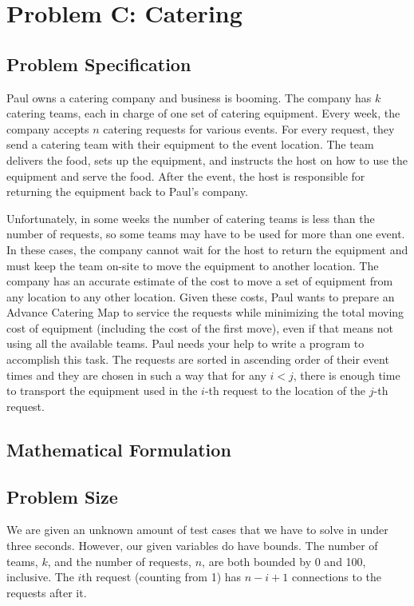 \documentclass[12pt]{article}
\begin{document}
\newpage

\section{Problem C: Catering}

\subsection{Problem Specification}

Paul owns a catering company and business is booming. The company has $k$
catering teams, each in charge of one set of catering equipment. Every
week, the company accepts $n$ catering requests for various events.
For every request, they send a catering team with their equipment to the
event location. The team delivers the food, sets up the equipment, and instructs
the host on how to use the equipment and serve the food. After the event, the
host is responsible for returning the equipment back to Paul’s company.

Unfortunately, in some weeks the number of catering teams is less than the number
of requests, so some teams may have to be used for more than one event. In these
cases, the company cannot wait for the host to return the equipment and must keep
the team on-site to move the equipment to another location. The company has an
accurate estimate of the cost to move a set of equipment from any location to any
other location. Given these costs, Paul wants to prepare an Advance Catering Map
to service the requests while minimizing the total moving cost of equipment
(including the cost of the first move), even if that means not using all the
available teams. Paul needs your help to write a program to accomplish this task.
The requests are sorted in ascending order of their event times and they are
chosen in such a way that for any $i < j$, there is enough time to
transport the equipment used in the $i$-th request to the location of the
$j$-th request.

\subsection{Mathematical Formulation}

\subsection{Problem Size}

We are given an unknown amount of test cases that we have to solve in under
three seconds. However, our given variables do have bounds. The number
of teams, $k$, and the number of requests, $n$, are both bounded by
0 and 100, inclusive. The $i$th request (counting from 1) has $n - i + 1$
connections to the requests after it.
\end{document}
